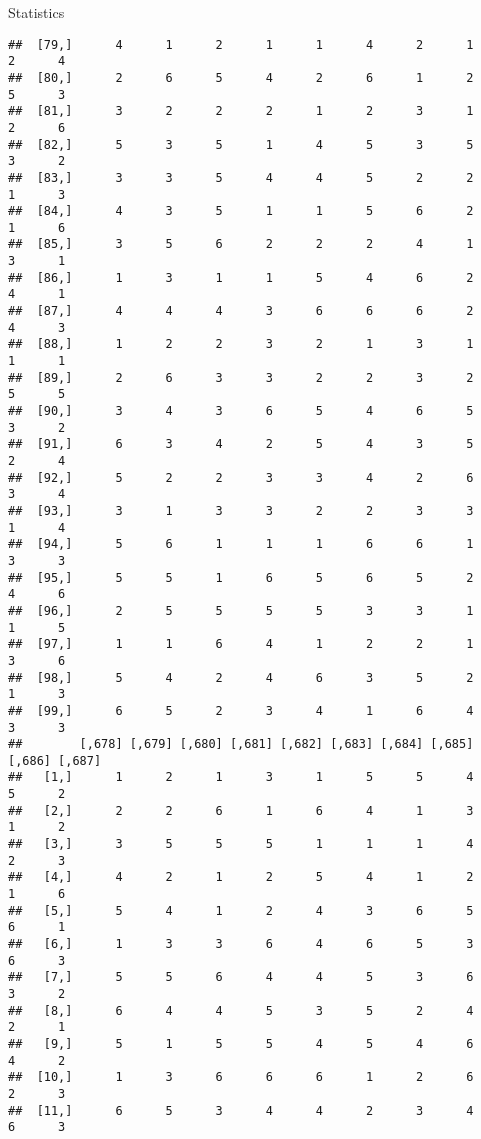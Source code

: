 \documentclass[
  ignorenonframetext,
]{beamer}
\begin{document}
\begin{frame}[fragile]{Statistics}
\begin{verbatim}
##  [79,]      4      1      2      1      1      4      2      1      2      4
##  [80,]      2      6      5      4      2      6      1      2      5      3
##  [81,]      3      2      2      2      1      2      3      1      2      6
##  [82,]      5      3      5      1      4      5      3      5      3      2
##  [83,]      3      3      5      4      4      5      2      2      1      3
##  [84,]      4      3      5      1      1      5      6      2      1      6
##  [85,]      3      5      6      2      2      2      4      1      3      1
##  [86,]      1      3      1      1      5      4      6      2      4      1
##  [87,]      4      4      4      3      6      6      6      2      4      3
##  [88,]      1      2      2      3      2      1      3      1      1      1
##  [89,]      2      6      3      3      2      2      3      2      5      5
##  [90,]      3      4      3      6      5      4      6      5      3      2
##  [91,]      6      3      4      2      5      4      3      5      2      4
##  [92,]      5      2      2      3      3      4      2      6      3      4
##  [93,]      3      1      3      3      2      2      3      3      1      4
##  [94,]      5      6      1      1      1      6      6      1      3      3
##  [95,]      5      5      1      6      5      6      5      2      4      6
##  [96,]      2      5      5      5      5      3      3      1      1      5
##  [97,]      1      1      6      4      1      2      2      1      3      6
##  [98,]      5      4      2      4      6      3      5      2      1      3
##  [99,]      6      5      2      3      4      1      6      4      3      3
##        [,678] [,679] [,680] [,681] [,682] [,683] [,684] [,685] [,686] [,687]
##   [1,]      1      2      1      3      1      5      5      4      5      2
##   [2,]      2      2      6      1      6      4      1      3      1      2
##   [3,]      3      5      5      5      1      1      1      4      2      3
##   [4,]      4      2      1      2      5      4      1      2      1      6
##   [5,]      5      4      1      2      4      3      6      5      6      1
##   [6,]      1      3      3      6      4      6      5      3      6      3
##   [7,]      5      5      6      4      4      5      3      6      3      2
##   [8,]      6      4      4      5      3      5      2      4      2      1
##   [9,]      5      1      5      5      4      5      4      6      4      2
##  [10,]      1      3      6      6      6      1      2      6      2      3
##  [11,]      6      5      3      4      4      2      3      4      6      3

\end{verbatim}
\end{frame}
\end{document}
